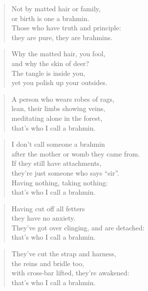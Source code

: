 \documentclass[12pt,openany]{book}%
\begin{document}
\begin{verse}%
Not by matted hair or family, \\
or birth is one a brahmin. \\
Those who have truth and principle: \\
they are pure, they are brahmins. 

%
\end{verse}

\begin{verse}%
Why the matted hair, you fool, \\
and why the skin of deer? \\
The tangle is inside you, \\
yet you polish up your outsides. 

%
\end{verse}

\begin{verse}%
A person who wears robes of rags, \\
lean, their limbs showing veins, \\
meditating alone in the forest, \\
that’s who I call a brahmin. 

%
\end{verse}

\begin{verse}%
I don’t call someone a brahmin \\
after the mother or womb they came from. \\
If they still have attachments, \\
they’re just someone who says “sir”. \\
Having nothing, taking nothing: \\
that’s who I call a brahmin. 

%
\end{verse}

\begin{verse}%
Having cut off all fetters \\
they have no anxiety. \\
They’ve got over clinging, and are detached: \\
that’s who I call a brahmin. 

%
\end{verse}

\begin{verse}%
They’ve cut the strap and harness, \\
the reins and bridle too, \\
with cross-bar lifted, they’re awakened: \\
that’s who I call a brahmin. 

%
\end{verse}
\end{document}
